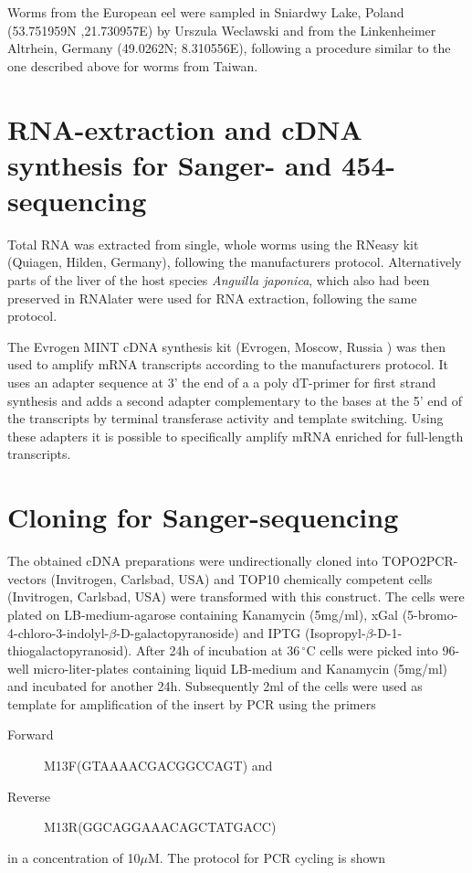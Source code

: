 Worms from the European eel were sampled in Sniardwy Lake, Poland
(53.751959N ,21.730957E) by Urszula Weclawski and from the
Linkenheimer Altrhein, Germany (49.0262N; 8.310556E), following a
procedure similar to the one described above for worms from Taiwan.

\section{RNA-extraction and cDNA synthesis for Sanger- and
  454-sequencing}

Total RNA was extracted from single, whole worms using the RNeasy kit
(Quiagen, Hilden, Germany), following the manufacturers
protocol. Alternatively parts of the liver of the host species
\textit{Anguilla japonica}, which also had been preserved in RNAlater
were used for RNA extraction, following the same protocol.

The Evrogen MINT cDNA synthesis kit (Evrogen, Moscow, Russia ) was
then used to amplify mRNA transcripts according to the manufacturers
protocol. It uses an adapter sequence at 3' the end of a a poly
dT-primer for first strand synthesis and adds a second adapter
complementary to the bases at the 5' end of the transcripts by
terminal transferase activity and template switching. Using these
adapters it is possible to specifically amplify mRNA enriched for
full-length transcripts. 

\section{Cloning for Sanger-sequencing}

The obtained cDNA preparations were undirectionally cloned into
TOPO2PCR-vectors (Invitrogen, Carlsbad, USA) and TOP10 chemically
competent cells (Invitrogen, Carlsbad, USA) were transformed with this
construct. The cells were plated on LB-medium-agarose containing
Kanamycin (5mg/ml), xGal
(5-bromo-4-chloro-3-indolyl-$\beta$-D-galactopyranoside) and IPTG
(Isopropyl-$\beta$-D-1-thiogalactopyranosid). After 24h of incubation
at $36\,^{\circ}\mathrm{C} $ cells were picked into 96-well
micro-liter-plates containing liquid LB-medium and Kanamycin (5mg/ml)
and incubated for another 24h. Subsequently 2ml of the cells were used
as template for amplification of the insert by PCR using the primers
\begin{description}
\item[Forward] M13F(GTAAAACGACGGCCAGT) and
\item[Reverse] M13R(GGCAGGAAACAGCTATGACC)
\end{description}
in a concentration of 10$\mu$M. The protocol for PCR cycling is shown

